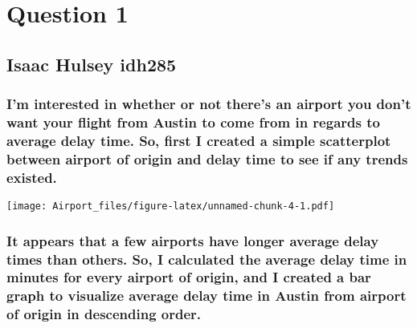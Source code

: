 \documentclass[]{article}
\title{}
\author{}
\date{}
\begin{document}
\hypertarget{question-1}{%
\section{Question 1}\label{question-1}}

\hypertarget{isaac-hulsey-idh285}{%
\subsection{Isaac Hulsey idh285}\label{isaac-hulsey-idh285}}

\hypertarget{im-interested-in-whether-or-not-theres-an-airport-you-dont-want-your-flight-from-austin-to-come-from-in-regards-to-average-delay-time.-so-first-i-created-a-simple-scatterplot-between-airport-of-origin-and-delay-time-to-see-if-any-trends-existed.}{%
\subsubsection{I'm interested in whether or not there's an airport you
don't want your flight from Austin to come from in regards to average
delay time. So, first I created a simple scatterplot between airport of
origin and delay time to see if any trends
existed.}\label{im-interested-in-whether-or-not-theres-an-airport-you-dont-want-your-flight-from-austin-to-come-from-in-regards-to-average-delay-time.-so-first-i-created-a-simple-scatterplot-between-airport-of-origin-and-delay-time-to-see-if-any-trends-existed.}}

\texttt{[image: Airport\_files/figure-latex/unnamed-chunk-4-1.pdf]}

\hypertarget{it-appears-that-a-few-airports-have-longer-average-delay-times-than-others.-so-i-calculated-the-average-delay-time-in-minutes-for-every-airport-of-origin-and-i-created-a-bar-graph-to-visualize-average-delay-time-in-austin-from-airport-of-origin-in-descending-order.}{%
\subsubsection{It appears that a few airports have longer average delay
times than others. So, I calculated the average delay time in minutes
for every airport of origin, and I created a bar graph to visualize
average delay time in Austin from airport of origin in descending
order.}\label{it-appears-that-a-few-airports-have-longer-average-delay-times-than-others.-so-i-calculated-the-average-delay-time-in-minutes-for-every-airport-of-origin-and-i-created-a-bar-graph-to-visualize-average-delay-time-in-austin-from-airport-of-origin-in-descending-order.}}
\end{document}
